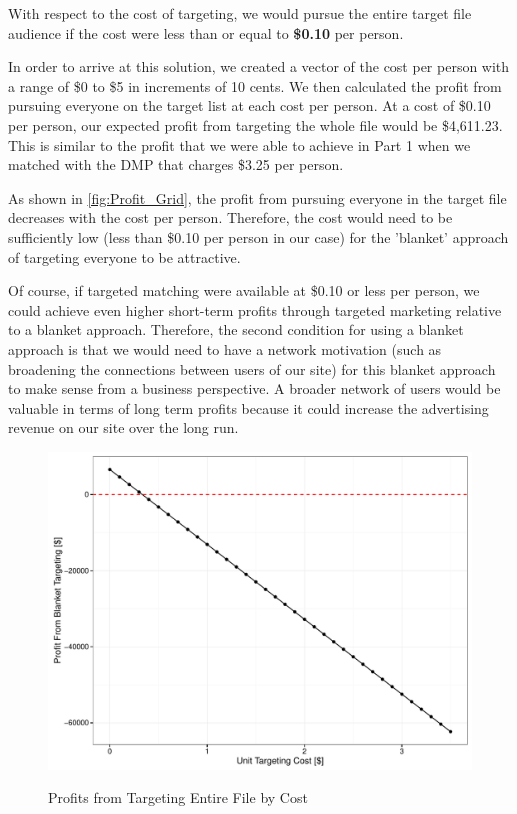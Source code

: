 With respect to the cost of targeting, we would pursue the entire target file audience if the cost were less than or equal to \textbf{\$0.10} per person.

In order to arrive at this solution, we created a vector of the cost per person with a range of \$0 to \$5 in increments of 10 cents. We then calculated the profit from pursuing everyone on the target list at each cost per person. At a cost of \$0.10 per person, our expected profit from targeting the whole file would be \$4,611.23. This is similar to the profit that we were able to achieve in Part 1 when we matched with the DMP that charges \$3.25 per person.

As shown in \vref{fig:Profit_Grid}, the profit from pursuing everyone in the target file decreases with the cost per person. Therefore, the cost would need to be sufficiently low (less than \$0.10 per person in our case) for the 'blanket' approach of targeting everyone to be attractive.

Of course, if targeted matching were available at \$0.10 or less per person, we could achieve even higher short-term profits through targeted marketing relative to a blanket approach. Therefore, the second condition for using a blanket approach is that we would need to have a network motivation (such as broadening the connections between users of our site) for this blanket approach to make sense from a business perspective. A broader network of users would be valuable in terms of long term profits because it could increase the advertising revenue on our site over the long run.

\begin{figure}[!htb]
  \centering
  \caption{Profits from Targeting Entire File by Cost}
  \includegraphics[scale=.75]{Profit_Grid2.pdf}
  \label{fig:Profit_Grid}
\end{figure}


